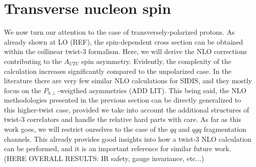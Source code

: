 \section{Transverse nucleon spin}
We now turn our attention to the case of transversely-polarized protons. As already shown at LO (REF), the spin-dependent cross section can be obtained within the collinear twist-3 formalism. Here, we will derive the NLO corrections contributing to the $A_{UTU}$ spin asymmetry. Evidently, the complexity of the calculation increases significantly compared to the unpolarized case. In the literature there are very few similar NLO calculations for SIDIS, and they mostly focus on the $P_{h\perp}$-weigthed asymmetries (ADD LIT). This being said, the NLO methodologies presented in the previous section can be directly generalized to this higher-twist case, provided we take into account the additional structures of twist-3 correlators and handle the relative hard parts with care. As far as this work goes, we will restrict ourselves to the case of the $qq$ and $qgq$ fragmentation channels. This already provides good insights into how a twist-3 NLO calculation can be performed, and it is an important reference for similar future work. (HERE OVERALL RESULTS: IR safety, gauge invariance, etc...)


